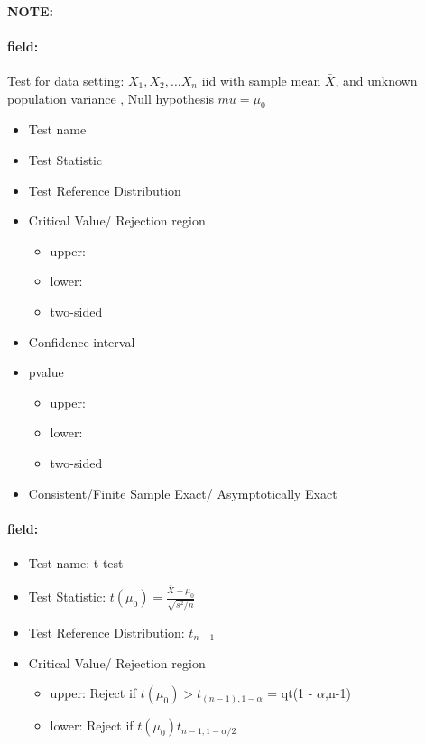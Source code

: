 \documentclass[12pt]{article}
\newenvironment{note}{\paragraph{NOTE:}}{}
\newenvironment{field}{\paragraph{field:}}{}
\begin{document}
\begin{note}
    \begin{field}
        Test for data setting: $X_1, X_2, \ldots X_n$ iid with sample mean $\bar{X}$, and unknown population variance , Null hypothesis $mu = \mu_0$
            \begin{itemize}
              \item Test name
              \item Test Statistic
              \item Test Reference Distribution
              \item Critical Value/ Rejection region
              \begin{itemize}
                \item upper:
                \item lower:
                \item two-sided
              \end{itemize}
              \item Confidence interval
              \item pvalue
              \begin{itemize}
                \item upper:
                \item lower:
                \item two-sided
              \end{itemize}
              \item Consistent/Finite Sample Exact/ Asymptotically Exact
            \end{itemize}
    \end{field}
    \begin{field}
        \begin{itemize}
              \item Test name: t-test
              \item Test Statistic: $t(\mu_0) = \frac{\bar{X} - \mu_0}{\sqrt{s^2/n}}$
              \item Test Reference Distribution: $t_{n-1}$
              \item Critical Value/ Rejection region
              \begin{itemize}
                \item upper: Reject if $t(\mu_0) > t_{(n-1),1-\alpha}$ = qt(1 - $\alpha$,n-1)
                \item lower: Reject if $t(\mu_0)  t_{n-1,1-\alpha/2}$
              \end{itemize}

\end{itemize}
\end{field}
\end{note}
\end{document}

